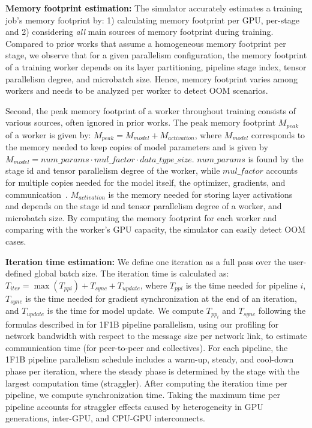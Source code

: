 \textbf{Memory footprint estimation:} The \sailor simulator accurately estimates a training job's memory footprint by: 1) calculating memory footprint per GPU, per-stage and 2) considering \textit{all} main sources of memory footprint during training. Compared to prior works that assume a homogeneous memory footprint per stage, we observe that for a given parallelism configuration, the memory footprint of a training worker depends on its layer partitioning, pipeline stage index, tensor parallelism degree, and microbatch size. Hence, memory footprint varies among workers and needs to be analyzed per worker to detect OOM scenarios.

Second, the peak memory footprint of a worker throughout training consists of various sources, often ignored in prior works. The peak memory footprint $M_{peak}$ of a worker is given by: $M_{peak} = M_{model} + M_{activation}$, where $M_{model}$ corresponds to the memory needed to keep copies of model parameters and is given by $M_{model} = num\_params \cdot mul\_factor \cdot data\_type\_size$. $num\_params$ is found by the stage id and tensor parallelism degree of the worker, while $mul\_factor$ accounts for multiple copies needed for the model itself, the optimizer, gradients, and communication~\cite{Rajbhandari21Zero}. $M_{activation}$ is the memory needed for storing layer activations and depends on the stage id and tensor parallelism degree of a worker, and microbatch size. By computing the memory footprint for each worker and comparing with the worker's GPU capacity, the simulator can easily detect OOM cases.

\textbf{Iteration time estimation:} We define one iteration as a full pass over the user-defined global batch size. The iteration time is calculated as:
$T_{iter} = \max(T_{ppi}) + T_{sync} + T_{update}$, where $T_{ppi}$ is the time needed for pipeline $i$, $T_{sync}$ is the time needed for gradient synchronization at the end of an iteration, and $T_{update}$ is the time for model update. We compute $T_{{pp}_i}$ and $T_{sync}$ following the formulas described in \cite{strati24crossregion} for 1F1B pipeline parallelism,  using our profiling for network bandwidth with respect to the message size per network link, to estimate communication time (for peer-to-peer and collectives). For each pipeline, the 1F1B pipeline parallelism schedule includes a warm-up, steady, and cool-down phase per iteration, where the steady phase is determined by the stage with the largest computation time (straggler). After computing the iteration time per pipeline, we compute synchronization time. Taking the maximum time per pipeline accounts for straggler effects caused by heterogeneity in GPU generations, inter-GPU, and CPU-GPU interconnects.

